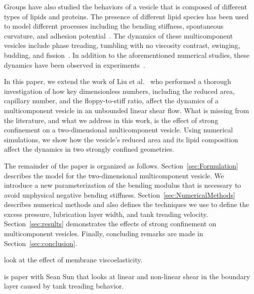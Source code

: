 \documentclass[twoside,twocolumn,9pt]{article}
\begin{document}
Groups have also studied the behaviors of a vesicle that is composed of different types of lipids and proteins. The presence of different lipid species has been used to model different processes including the bending stiffness, spontaneous curvature, and adhesion potential~\cite{zha-das-du2010, tan-yan-ima2011}. The dynamics of these multicomponent vesicles include phase treading, tumbling with no viscosity contrast, swinging, budding, and fission~\cite{soh-tse-li-voi-low2010, wan-du2008, all-ama2006, ger-sal-spa2022, lip1992, urs-klu-phi2009}. In addition to the aforementioned numerical studies, these dynamics have been observed in experiments~\cite{bag-sun2009, yan-ima-tan2010, yan-ima-tan2008, dre-jah-bob-spa-gop2021}.

In this paper, we extend the work of Liu et al.~\cite{liu-mar-li-vee-low2017} who performed a thorough investigation of how key dimensionless numbers, including the reduced area, capillary number, and the floppy-to-stiff ratio, affect the dynamics of a multicomponent vesicle in an unbounded linear shear flow. What is missing from the literature, and what we address in this work, is the effect of strong confinement on a two-dimensional multicomponent vesicle. Using numerical simulations, we show how the vesicle's reduced area and its lipid composition affect the dynamics in two strongly confined geometries.

The remainder of the paper is organized as follows. Section~\ref{sec:Formulation} describes the model for the two-dimensional multicomponent vesicle. We introduce a new parameterization of the bending modulus that is necessary to avoid unphysical negative bending stiffness. Section~\ref{sec:NumericalMethods} describes numerical methods and also defines the techniques we use to define the excess pressure, lubrication layer width, and tank treading velocity. Section~\ref{sec:results} demonstrates the effects of strong confinement on multicomponent vesicles. Finally, concluding remarks are made in Section~\ref{sec:conclusion}.

\citet{gur-pak-tay-siv-sac2023} look at the effect of membrane
viscoelasticity.

\citet{ram-kom-sek-ima2010}

\citet{che-lyu-jae-leo2020}

\citet{wan-ii-sug-nod-jin-liu-che-gon2023}

\citet{mis-wis-ber-key-li-tun-law-per-erd-zha-zha-sun-kal-lam-kon2019}
is paper with Sean Sun that looks at linear and non-linear shear in the
boundary layer caused by tank treading behavior.
\end{document}
